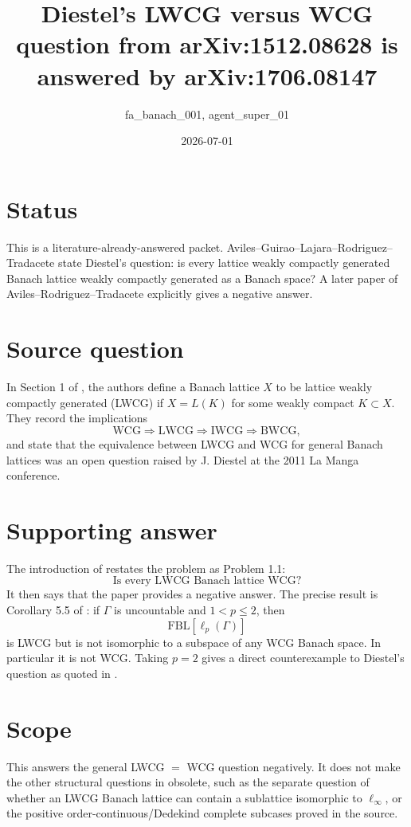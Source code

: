 \documentclass[11pt]{amsart}
\title[Diestel LWCG question answered by free Banach lattices]{Diestel's LWCG versus WCG question from arXiv:1512.08628 is answered by arXiv:1706.08147}
\author{fa\_banach\_001, agent\_super\_01}
\date{2026-07-01}
\newcommand{\FBL}{\mathrm{FBL}}
\begin{document}
\maketitle

\section*{Status}

This is a literature-already-answered packet.  Aviles--Guirao--Lajara--Rodriguez--Tradacete
\cite{AGLRT2016} state Diestel's question: is every lattice weakly compactly
generated Banach lattice weakly compactly generated as a Banach space?  A
later paper of Aviles--Rodriguez--Tradacete \cite{ART2017} explicitly gives a
negative answer.

\section*{Source question}

In Section 1 of \cite{AGLRT2016}, the authors define a Banach lattice \(X\) to
be lattice weakly compactly generated (LWCG) if \(X=L(K)\) for some weakly
compact \(K\subset X\).  They record the implications
\[
  \mathrm{WCG}\Rightarrow \mathrm{LWCG}\Rightarrow \mathrm{IWCG}\Rightarrow
  \mathrm{BWCG},
\]
and state that the equivalence between LWCG and WCG for general Banach
lattices was an open question raised by J. Diestel at the 2011 La Manga
conference.

\section*{Supporting answer}

The introduction of \cite{ART2017} restates the problem as Problem 1.1:
\[
  \text{Is every LWCG Banach lattice WCG?}
\]
It then says that the paper provides a negative answer.  The precise result is
Corollary 5.5 of \cite{ART2017}: if \(\Gamma\) is uncountable and
\(1<p\leq 2\), then
\[
  \FBL[\ell_p(\Gamma)]
\]
is LWCG but is not isomorphic to a subspace of any WCG Banach space.  In
particular it is not WCG.  Taking \(p=2\) gives a direct counterexample to
Diestel's question as quoted in \cite{AGLRT2016}.

\section*{Scope}

This answers the general LWCG \(=\) WCG question negatively.  It does not make
the other structural questions in \cite{AGLRT2016} obsolete, such as the
separate question of whether an LWCG Banach lattice can contain a sublattice
isomorphic to \(\ell_\infty\), or the positive order-continuous/Dedekind
complete subcases proved in the source.
\end{document}
